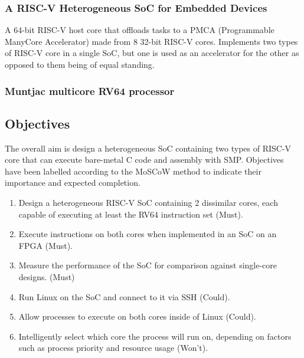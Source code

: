 \subsubsection{A RISC-V Heterogeneous SoC for Embedded Devices}
A 64-bit RISC-V host core that offloads tasks to a PMCA (Programmable ManyCore Accelerator) made from 8 32-bit RISC-V cores. Implements two types of RISC-V core in a single SoC, but one is used as an accelerator for the other as opposed to them being of equal standing.

\subsubsection{Muntjac multicore RV64 processor}


\subsection{Objectives}

The overall aim is design a heterogeneous SoC containing two types of RISC-V core that can execute bare-metal C code and assembly with SMP. Objectives have been labelled according to the MoSCoW method to indicate their importance and expected completion.
\begin{enumerate}
    \item Design a heterogeneous RISC-V SoC containing 2 dissimilar cores, each capable of executing at least the RV64 instruction set (Must).
    \item Execute instructions on both cores when implemented in an SoC on an FPGA (Must).
    \item Measure the performance of the SoC for comparison against single-core designs. (Must)
    \item Run Linux on the SoC and connect to it via SSH (Could).
    \item Allow processes to execute on both cores inside of Linux (Could).
    \item Intelligently select which core the process will run on, depending on factors such as process priority and resource usage (Won't).
\end{enumerate}